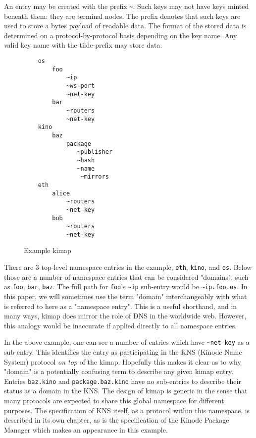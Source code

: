 \documentclass[runningheads]{llncs}
\begin{document}
An entry may be created with the prefix \verb|~|. Such keys may not have keys minted beneath them: they are terminal nodes. The prefix denotes that such keys are used to store a bytes payload of readable data. The format of the stored data is determined on a protocol-by-protocol basis depending on the key name. Any valid key name with the tilde-prefix may store data.

\begin{figure}
    \centering
    \begin{lstlisting}
    os
        foo
            ~ip
            ~ws-port
            ~net-key
        bar
            ~routers
            ~net-key
    kino
        baz
            package
               ~publisher
               ~hash
               ~name
                ~mirrors
    eth
        alice
            ~routers
            ~net-key
        bob
            ~routers
            ~net-key
    \end{lstlisting}
    \caption{Example kimap}
    \label{fig:example kimap}
\end{figure}

There are 3 top-level namespace entries in the example, \verb|eth|, \verb|kino|, and \verb|os|.
Below those are a number of namespace entries that can be considered "domains", such as \verb|foo|, \verb|bar|, \verb|baz|.
The full path for \verb|foo|'s \verb|~ip| sub-entry would be \verb|~ip.foo.os|.
In this paper, we will sometimes use the term "domain" interchangeably with what is referred to here as a "namespace entry".
This is a useful shorthand, and in many ways, kimap does mirror the role of DNS in the worldwide web.
However, this analogy would be inaccurate if applied directly to all namespace entries.

In the above example, one can see a number of entries which have \verb|~net-key| as a sub-entry.
This identifies the entry as participating in the KNS (Kinode Name System) protocol \textit{on top} of the kimap.
Hopefully this makes it clear as to why "domain" is a potentially confusing term to describe any given kimap entry.
Entries \verb|baz.kino| and \verb|package.baz.kino| have no sub-entries to describe their status as a domain in the KNS.
The design of kimap is generic in the sense that many protocols are expected to share this global namespace for different purposes.
The specification of KNS itself, as a protocol within this namespace, is described in its own chapter, as is the specification of the Kinode Package Manager which makes an appearance in this example.
\end{document}
